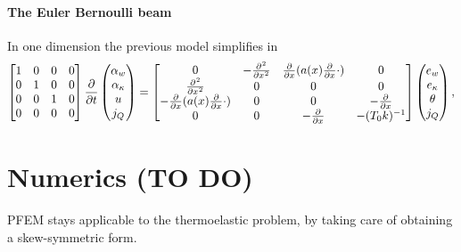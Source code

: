 \documentclass[11t]{article}
\begin{document}
\paragraph{The Euler Bernoulli beam}
In one dimension the previous model simplifies in
\begin{equation}
\begin{bmatrix}
1 & 0 & 0 & 0\\
0 & 1 & 0 & 0\\
0 & 0 & 1 & 0\\
0 & 0 & 0 & 0\\
\end{bmatrix}
\diffp{}{t}
\begin{pmatrix}
\alpha_w \\
\alpha_\kappa \\
u \\
j_Q \\
\end{pmatrix} = 
\begin{bmatrix}
0 & -\diffp[2]{}{x} & \diffp{}{x}(a(x) \diffp{}{x} \cdot) & 0\\
\diffp[2]{}{x} & 0 & 0 & 0 \\
- \diffp{}{x}(a(x) \diffp{}{x} \cdot) & 0 & 0 & - \diffp{}{x} \\
0 & 0 & - \diffp{}{x} & - (T_0 k)^{-1} \\
\end{bmatrix}
\begin{pmatrix}
e_w \\
e_\kappa \\
\theta \\
j_Q \\
\end{pmatrix},
\end{equation}

\section{Numerics (TO DO)}

PFEM stays applicable to the thermoelastic problem, by taking care of obtaining a skew-symmetric form. 




 
	
\end{document}
